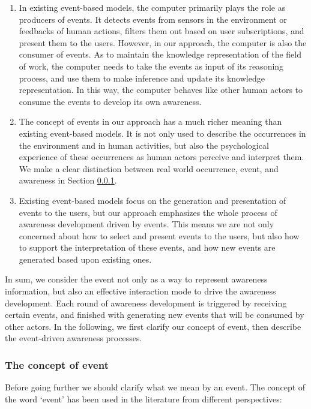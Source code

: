 \begin{enumerate}
   \item In existing event-based models, the computer primarily plays the role as producers of events. It detects events from sensors in the environment or feedbacks of human actions, filters them out based on user subscriptions, and present them to the users. However, in our approach, the computer is also the consumer of events. As to maintain the knowledge representation of the field of work, the computer needs to take the events as input of its reasoning process, and use them to make inference and update its knowledge representation. In this way, the computer behaves like other human actors to consume the events to develop its own awareness.
   \item The concept of events in our approach has a much richer meaning than existing event-based models. It is not only used to describe the occurrences in the environment and in human activities, but also the psychological experience of these occurrences as human actors perceive and interpret them. We make a clear distinction between real world occurrence, event, and awareness in Section \ref{ssub:the_concept_of_events}.
   \item Existing event-based models focus on the generation and presentation of events to the users, but our approach emphasizes the whole process of awareness development driven by events. This means we are not only concerned about how to select and present events to the users, but also how to support the interpretation of these events, and how new events are generated based upon existing ones.
\end{enumerate}

In sum, we consider the event not only as a way to represent awareness information, but also an effective interaction mode to drive the awareness development. Each round of awareness development is triggered by receiving certain events, and finished with generating new events that will be consumed by other actors. In the following, we first clarify our concept of event, then describe the event-driven awareness processes. 

\subsubsection{The concept of event} %
\label{ssub:the_concept_of_events}
Before going further we should clarify what we mean by an event. The concept of the word `event' has been used in the literature from different perspectives:

